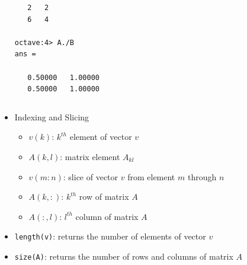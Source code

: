 \documentclass[t,compress,xcolor=svgnames]{beamer}
\begin{document}
\begin{frame}
\begin{itemize}
{\begin{columns}
\begin{verbatim}
   2   2
   6   4

octave:4> A./B
ans =

   0.50000   1.00000
   0.50000   1.00000
        \end{verbatim}
      \end{columns}
    }
    \framebreak
    \item Indexing and Slicing
    \begin{itemize}
      \item $v(k)$: $k^{th}$ element of vector $v$
      \item $A(k,l)$: matrix element $A_{kl}$
      \item $v(m:n)$: slice of vector $v$ from element $m$ through $n$
      \item $A(k,:)$: $k^{th}$ row of matrix $A$
      \item $A(:,l)$: $l^{th}$ column of matrix $A$
    \end{itemize}
    \item \texttt{length(v)}: returns the number of elements of vector $v$
    \item \texttt{size(A)}: returns the number of rows and columns of matrix $A$
  \end{itemize}
\end{frame}
\end{document}
